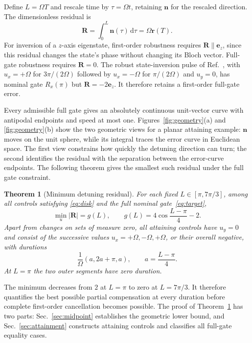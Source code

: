 \documentclass[12pt]{iopjournal}
\newtheorem{theorem}{Theorem}
\newcommand{\dd}{\mathrm{d}}
\newcommand{\nvec}{\mathbf n}
\newcommand{\rvec}{\mathbf r}
\newcommand{\Rvec}{\mathbf R}
\newcommand{\ez}{\mathbf e_z}
\begin{document}
Define $L=\Omega T$ and rescale time by $\tau=\Omega t$, retaining
$\nvec$ for the rescaled direction. The dimensionless residual is
\begin{equation}
 \Rvec=\int_0^L\nvec(\tau)\,\dd\tau=\Omega\rvec(T).
 \label{eq:rescaled-error}
\end{equation}
For inversion of a $z$-axis eigenstate, first-order robustness requires
$\Rvec\parallel\ez$, since this residual changes the state's phase
without changing its Bloch vector. Full-gate robustness requires
$\Rvec=0$. The robust state-inversion pulse of Ref.~\cite{vandamme2017},
with $u_x=+\Omega$ for $3\pi/(2\Omega)$ followed by $u_x=-\Omega$
for $\pi/(2\Omega)$ and $u_y=0$, has nominal gate $R_x(\pi)$ but
$\Rvec=-2\ez$. It therefore retains a first-order full-gate error.

Every admissible full gate gives an absolutely continuous
unit-vector curve with antipodal endpoints and speed at most one.
Figures~\ref{fig:geometry}(a) and \ref{fig:geometry}(b) show the two
geometric views for a planar attaining example: $\nvec$ moves on the unit sphere, while its integral
traces the error curve in Euclidean space. The first view constrains
how quickly the detuning direction can turn; the second identifies
the residual with the separation between the error-curve endpoints.
The following theorem gives the smallest such residual under the
full gate constraint.




\begin{theorem}[Minimum detuning residual]
\label{thm:gate}
For each fixed $L\in[\pi,7\pi/3]$, among all controls satisfying
\eqref{eq:disk} and the full nominal gate~\eqref{eq:target},
\begin{equation}
 \boxed{\min_u|\Rvec|=g(L),\qquad
 g(L)=4\cos\frac{L-\pi}{4}-2.}
 \label{eq:residual-minimum}
\end{equation}
Apart from changes on sets of measure zero, all attaining controls have
$u_y=0$ and consist of the successive values
$u_x=+\Omega,-\Omega,+\Omega$, or their overall negative, with durations
\begin{equation}
 \frac{1}{\Omega}(a,2a+\pi,a),\qquad
 a=\frac{L-\pi}{4}.
 \label{eq:family-durations}
\end{equation}
At $L=\pi$ the two outer segments have zero duration.
\end{theorem}

The minimum decreases from $2$ at $L=\pi$ to zero at $L=7\pi/3$.
It therefore quantifies the best possible partial compensation at
every duration before complete first-order cancellation becomes
possible. The proof of Theorem~\ref{thm:gate} has two parts:
Sec.~\ref{sec:midpoint} establishes the geometric lower bound, and
Sec.~\ref{sec:attainment} constructs attaining controls and classifies
all full-gate equality cases.
\end{document}
